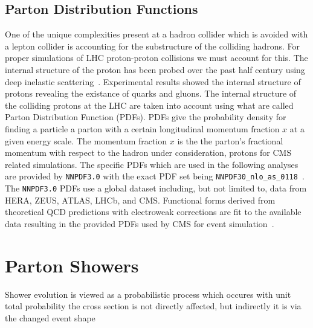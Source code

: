 \subsection{Parton Distribution Functions}
One of the unique complexities present at a hadron collider which is avoided with a
lepton collider is accounting for the substructure of the colliding hadrons. For proper simulations
of LHC proton-proton collisions we must account for this. The internal structure of the proton
has been probed over the past half century using deep inelastic scattering~\cite{Breidenbach:1969kd, PhysRevLett.23.930}.
Experimental results showed the internal structure of protons revealing the existance of
quarks and gluons. The internal structure of the colliding protons at the LHC are taken into
account using what are called Parton Distribution Function (PDFs). PDFs give the probability
density for finding a particle a parton with a certain longitudinal momentum fraction $x$ at a given
energy scale. The momentum fraction $x$ is the the parton's fractional momentum with respect
to the hadron under consideration, protons for CMS related simulations. 
The specific PDFs which are used in the
following analyses are provided by \texttt{NNPDF3.0} with the exact PDF set being 
\texttt{NNPDF30\_nlo\_as\_0118}~\cite{Ball:2014uwa, Ball:2011uy}. The \texttt{NNPDF3.0} PDFs
use a global dataset including, but not limited to, data from HERA, ZEUS, ATLAS, LHCb, and CMS.
Functional forms derived from theoretical QCD predictions with electroweak corrections are fit
to the available data resulting in the provided PDFs used by CMS for event simulation~\cite{Ball:2014uwa}.



\section{Parton Showers}
    Shower evolution is viewed as a probabilistic process which occures with unit total probability
    the cross section is not directly affected, but indirectly it is via the changed event shape


